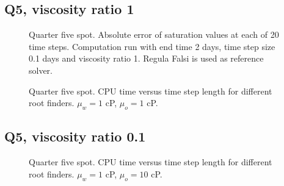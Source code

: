 \documentclass[a4paper,12pt]{report}
\begin{document}
\clearpage

\subsection{Q5, viscosity ratio 1}

\begin{figure}[!ht]
\begin{center}

\end{center}
\caption{Quarter five spot. Absolute error of saturation values at each of 20 time steps. Computation run with end time 2 days, time step size 0.1 days and viscosity ratio 1. Regula Falsi is used as reference solver.}
\end{figure}

\begin{figure}[!ht]
\begin{center}

\end{center}
\caption{Quarter five spot. CPU time versus time step length for different root finders. $\mu_w = 1$ cP, $\mu_o = 1$ cP. }
\end{figure}

%

\clearpage

\subsection{Q5, viscosity ratio 0.1}

\begin{figure}[!ht]
\begin{center}

\end{center}
\caption{Quarter five spot. CPU time versus time step length for different root finders. $\mu_w = 1$ cP, $\mu_o = 10$ cP.}
\end{figure}
\end{document}
